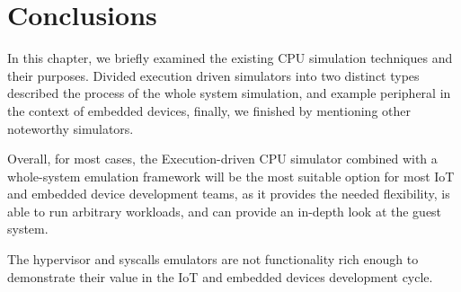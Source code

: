 \section{Conclusions}

In this chapter, we briefly examined the existing CPU simulation techniques and their purposes. Divided execution
driven simulators into two distinct types described the process of the whole system simulation, and example peripheral
in the context of embedded devices, finally, we finished by mentioning other noteworthy simulators.

Overall, for most cases, the Execution-driven CPU simulator combined with a whole-system emulation framework will be the
most suitable option for most IoT and embedded device development teams, as it provides the needed flexibility, is able
to run arbitrary workloads, and can provide an in-depth look at the guest system.

The hypervisor and syscalls emulators are not functionality rich enough to demonstrate their value in the IoT and
embedded devices development cycle.